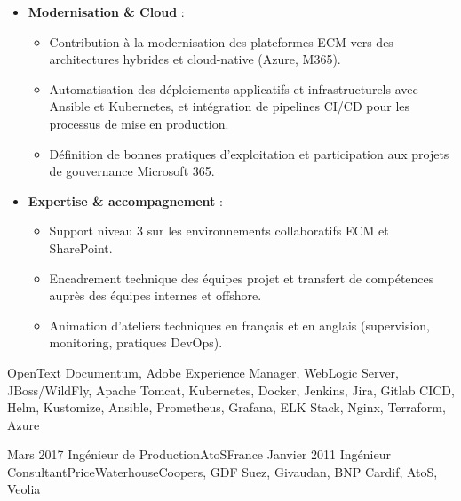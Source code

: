 \begin{experiences}
{\begin{itemize}[left=0pt,label={},itemsep=0.5em]
          \item \textbf{Modernisation \& Cloud} :
            \begin{itemize}[itemsep=0.2em,topsep=0.2em,parsep=0pt]
              \small
              \item Contribution à la modernisation des plateformes ECM vers des architectures hybrides et cloud-native (Azure, M365).
              \item Automatisation des déploiements applicatifs et infrastructurels avec Ansible et Kubernetes, et intégration de pipelines CI/CD pour les processus de mise en production.
              \item Définition de bonnes pratiques d’exploitation et participation aux projets de gouvernance Microsoft 365.
            \end{itemize}

          \item \textbf{Expertise \& accompagnement} :
            \begin{itemize}[itemsep=0.2em,topsep=0.2em,parsep=0pt]
              \small
              \item Support niveau 3 sur les environnements collaboratifs ECM et SharePoint.
              \item Encadrement technique des équipes projet et transfert de compétences auprès des équipes internes et offshore.
              \item Animation d’ateliers techniques en français et en anglais (supervision, monitoring, pratiques DevOps).
            \end{itemize}

        \end{itemize}
    }
    {OpenText Documentum, Adobe Experience Manager, WebLogic Server, JBoss/WildFly, Apache Tomcat, Kubernetes, Docker, Jenkins, Jira, Gitlab CICD, Helm, Kustomize, Ansible, Prometheus, Grafana, ELK Stack, Nginx, Terraform, Azure}
    



\emptySeparator
\emptySeparator

\consultantexperience
    {Mars 2017}       {Ingénieur de Production}{AtoS}{France}
    {Janvier 2011}    {Ingénieur Consultant}{PriceWaterhouseCoopers, GDF Suez, Givaudan, BNP Cardif, AtoS, Veolia} {
        \begin{itemize}[left=0pt,label={},itemsep=0.4em]


\end{itemize}}
\end{experiences}
